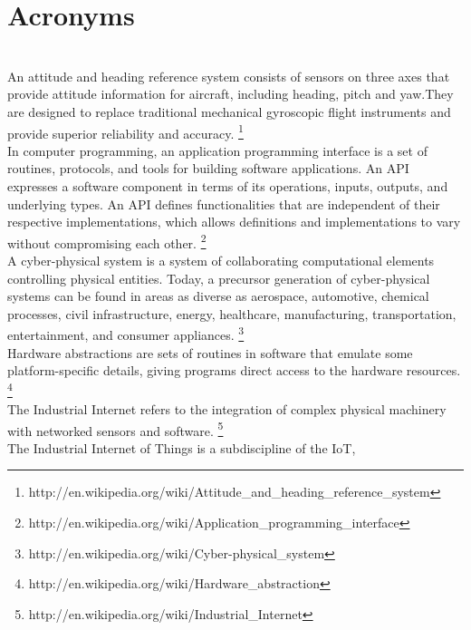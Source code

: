 \clearpage
\section{Acronyms}
\label{acronyms}

\begin{acronym}
	\\
		An attitude and heading reference system consists of sensors on
		three axes that provide attitude information for aircraft, including
		heading, pitch and yaw.They are designed to replace traditional
		mechanical gyroscopic flight instruments and provide superior
		reliability and accuracy.
		\footnote{http://en.wikipedia.org/wiki/Attitude\_and\_heading\_reference\_system}
	\\
		In computer programming, an application programming interface is a set
		of routines, protocols, and tools for building software applications.
		An API expresses a software component in terms of its operations,
		inputs, outputs, and underlying types. An API defines functionalities
		that are independent of their respective implementations, which allows
		definitions and implementations to vary without compromising each
		other.
		\footnote{http://en.wikipedia.org/wiki/Application\_programming\_interface}
	\\
		A cyber-physical system is a system of collaborating computational
		elements controlling physical entities. Today, a precursor generation
		of cyber-physical systems can be found in areas as diverse as
		aerospace, automotive, chemical processes, civil infrastructure,
		energy, healthcare, manufacturing, transportation, entertainment, and
		consumer appliances.
		\footnote{http://en.wikipedia.org/wiki/Cyber-physical\_system}
	\\
		Hardware abstractions are sets of routines in software that emulate
		some platform-specific details, giving programs direct access to the
		hardware resources.
		\footnote{http://en.wikipedia.org/wiki/Hardware\_abstraction}
	\\
		The Industrial Internet refers to the integration of complex physical
		machinery with networked sensors and software.
		\footnote{http://en.wikipedia.org/wiki/Industrial\_Internet}
	\\
		The Industrial Internet of Things is a subdiscipline of the \acs{IoT},

\end{acronym}
